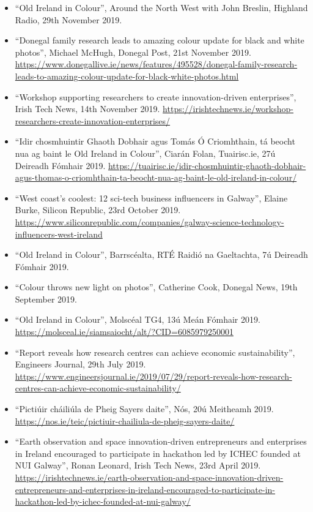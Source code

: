 \documentclass[10pt,a4paper]{res} %
\begin{document}
\begin{resume}
{\begin{itemize}
\item ``Old Ireland in Colour'', Around the North West with John Breslin, Highland Radio, 29th November 2019.
\item ``Donegal family research leads to amazing colour update for black and white photos'', Michael McHugh, Donegal Post, 21st November 2019. \url{https://www.donegallive.ie/news/features/495528/donegal-family-research-leads-to-amazing-colour-update-for-black-white-photos.html}
\item ``Workshop supporting researchers to create innovation-driven enterprises'', Irish Tech News, 14th November 2019. \url{https://irishtechnews.ie/workshop-researchers-create-innovation-enterprises/}
\item ``Idir chosmhuintir Ghaoth Dobhair agus Tom\'{a}s \'{O} Criomhthain, t\'{a} beocht nua ag baint le Old Ireland in Colour'', Ciar\'{a}n Folan, Tuairisc.ie, 27\'{u} Deireadh F\'{o}mhair 2019. \url{https://tuairisc.ie/idir-chosmhuintir-ghaoth-dobhair-agus-thomas-o-criomhthain-ta-beocht-nua-ag-baint-le-old-ireland-in-colour/}
\item ``West coast's coolest: 12 sci-tech business influencers in Galway'', Elaine Burke, Silicon Republic, 23rd October 2019. \url{https://www.siliconrepublic.com/companies/galway-science-technology-influencers-west-ireland}
\item ``Old Ireland in Colour'', Barrsc\'{e}alta, RT\'{E} Raidi\'{o} na Gaeltachta, 7\'{u} Deireadh F\'{o}mhair 2019.
\item ``Colour throws new light on photos'', Catherine Cook, Donegal News, 19th September 2019.
\item ``Old Ireland in Colour'', Molsc\'{e}al TG4, 13\'{u} Me\'{a}n F\'{o}mhair 2019. \url{https://molsceal.ie/siamsaiocht/alt/?CID=6085979250001}
\item ``Report reveals how research centres can achieve economic sustainability'', Engineers Journal, 29th July 2019. \url{https://www.engineersjournal.ie/2019/07/29/report-reveals-how-research-centres-can-achieve-economic-sustainability/}
\item ``Picti\'{u}ir ch\'{a}ili\'{u}la de Pheig Sayers daite'', N\'{o}s, 20\'{u} Meitheamh 2019. \url{https://nos.ie/teic/pictiuir-chailiula-de-pheig-sayers-daite/}
\item ``Earth observation and space innovation-driven entrepreneurs and enterprises in Ireland encouraged to participate in hackathon led by ICHEC founded at NUI Galway'', Ronan Leonard, Irish Tech News, 23rd April 2019. \url{https://irishtechnews.ie/earth-observation-and-space-innovation-driven-entrepreneurs-and-enterprises-in-ireland-encouraged-to-participate-in-hackathon-led-by-ichec-founded-at-nui-galway/}

\end{itemize}}
\end{resume}
\end{document}
